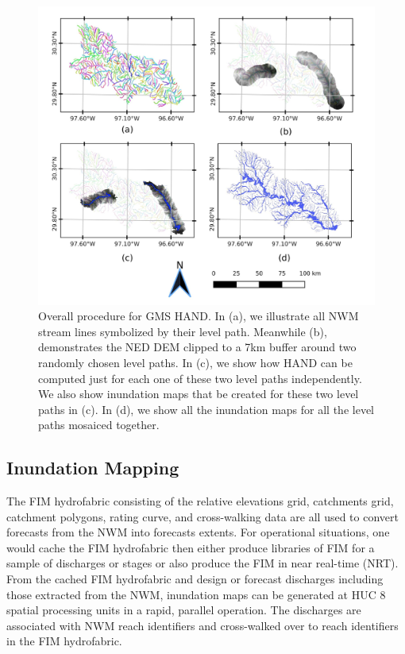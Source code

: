 \begin{figure}[h!]
\centering
\includegraphics[scale=1.0]{figures/gms_methods.jpg}
\caption{Overall procedure for GMS HAND.
In (a), we illustrate all NWM stream lines symbolized by their level path.
Meanwhile (b), demonstrates the NED DEM clipped to a 7km buffer around two randomly chosen level paths.
In (c), we show how HAND can be computed just for each one of these two level paths independently. 
We also show inundation maps that be created for these two level paths in (c). 
In (d), we show all the inundation maps for all the level paths mosaiced together. }
\label{fig:gms_methods}
\end{figure}
%
\subsection{Inundation Mapping}
\label{ssec:inundation_mapping}
%
The FIM hydrofabric consisting of the relative elevations grid, catchments grid, catchment polygons, rating curve, and cross-walking data are all used to convert forecasts from the NWM into forecasts extents.
For operational situations, one would cache the FIM hydrofabric then either produce libraries of FIM for a sample of discharges or stages or also produce the FIM in near real-time (NRT).
From the cached FIM hydrofabric and design or forecast discharges including those extracted from the NWM, inundation maps can be generated at HUC 8 spatial processing units in a rapid, parallel operation. 
The discharges are associated with NWM reach identifiers and cross-walked over to reach identifiers in the FIM hydrofabric.


